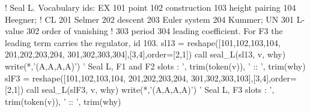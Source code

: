 \documentclass[10pt,twocolumn]{article}
\newenvironment{Shaded}{}{}
\newcommand{\CommentTok}[1]{#1}
\newcommand{\DecValTok}[1]{#1}
\newcommand{\FunctionTok}[1]{#1}
\newcommand{\KeywordTok}[1]{#1}
\newcommand{\NormalTok}[1]{#1}
\newcommand{\StringTok}[1]{#1}
\providecommand{\CommentTok}[1]{#1}
\providecommand{\DecValTok}[1]{#1}
\providecommand{\FunctionTok}[1]{#1}
\providecommand{\KeywordTok}[1]{#1}
\providecommand{\NormalTok}[1]{#1}
\providecommand{\StringTok}[1]{#1}
\providecommand{\textquotesingle}{'}
\providecommand{\CommentTok}[1]{#1}
\providecommand{\DecValTok}[1]{#1}
\providecommand{\FunctionTok}[1]{#1}
\providecommand{\KeywordTok}[1]{#1}
\providecommand{\NormalTok}[1]{#1}
\providecommand{\StringTok}[1]{#1}
\begin{document}
\begin{strip}
\begin{Shaded}
\begin{Highlighting}[]
  \CommentTok{! Seal L. Vocabulary ids: EX 101 point 102 construction 103 height pairing 104 Heegner;}
  \CommentTok{! CL 201 Selmer 202 descent 203 Euler system 204 Kummer; UN 301 L{-}value 302 order of vanishing}
  \CommentTok{! 303 period 304 leading coefficient. For F3 the leading term carries the regulator, id 103.}
\NormalTok{  sl13 }\KeywordTok{=} \FunctionTok{reshape}\NormalTok{(}\KeywordTok{[}\DecValTok{101}\NormalTok{,}\DecValTok{102}\NormalTok{,}\DecValTok{103}\NormalTok{,}\DecValTok{104}\NormalTok{, }\DecValTok{201}\NormalTok{,}\DecValTok{202}\NormalTok{,}\DecValTok{203}\NormalTok{,}\DecValTok{204}\NormalTok{, }\DecValTok{301}\NormalTok{,}\DecValTok{302}\NormalTok{,}\DecValTok{303}\NormalTok{,}\DecValTok{304}\KeywordTok{]}\NormalTok{,}\KeywordTok{[}\DecValTok{3}\NormalTok{,}\CommentTok{4],order=[2,1])}
  \KeywordTok{call}\NormalTok{ seal\_L(sl13, v, why)}
  \FunctionTok{write(*}\NormalTok{,}\StringTok{\textquotesingle{}(A,A,A,A)\textquotesingle{}}\FunctionTok{)} \StringTok{\textquotesingle{} Seal L, F1 and F2 slots   : \textquotesingle{}}\NormalTok{, }\FunctionTok{trim}\NormalTok{(token(v)), }\CommentTok{\textquotesingle{} :: \textquotesingle{}, trim(why)}
\NormalTok{  slF3 }\KeywordTok{=} \FunctionTok{reshape}\NormalTok{(}\KeywordTok{[}\DecValTok{101}\NormalTok{,}\DecValTok{102}\NormalTok{,}\DecValTok{103}\NormalTok{,}\DecValTok{104}\NormalTok{, }\DecValTok{201}\NormalTok{,}\DecValTok{202}\NormalTok{,}\DecValTok{203}\NormalTok{,}\DecValTok{204}\NormalTok{, }\DecValTok{301}\NormalTok{,}\DecValTok{302}\NormalTok{,}\DecValTok{303}\NormalTok{,}\DecValTok{103}\KeywordTok{]}\NormalTok{,}\KeywordTok{[}\DecValTok{3}\NormalTok{,}\CommentTok{4],order=[2,1])}
  \KeywordTok{call}\NormalTok{ seal\_L(slF3, v, why)}
  \FunctionTok{write(*}\NormalTok{,}\StringTok{\textquotesingle{}(A,A,A,A)\textquotesingle{}}\FunctionTok{)} \StringTok{\textquotesingle{} Seal L, F3 slots          : \textquotesingle{}}\NormalTok{, }\FunctionTok{trim}\NormalTok{(token(v)), }\CommentTok{\textquotesingle{} :: \textquotesingle{}, trim(why)}


\end{Highlighting}
\end{Shaded}
\end{strip}
\end{document}

